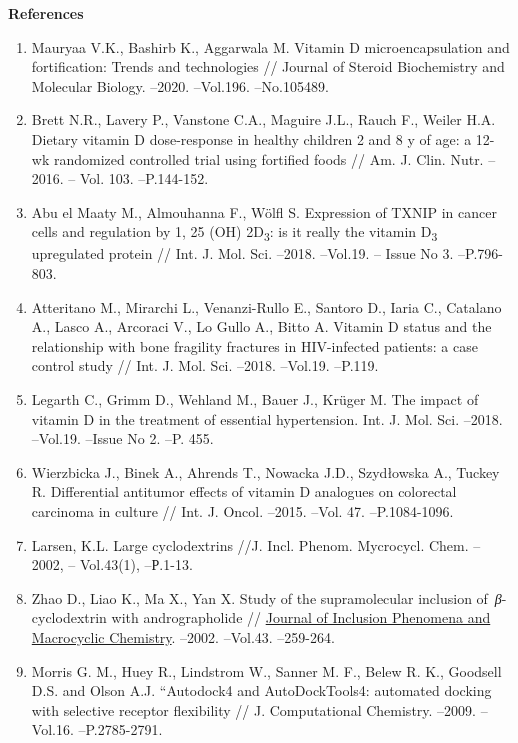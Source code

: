 {\bfseries References}


\begin{enumerate}
\item
Mauryaa V.K., Bashirb K., Aggarwala M. Vitamin D microencapsulation
and fortification: Trends and technologies // Journal of Steroid
Biochemistry and Molecular Biology. --2020. --Vol.196. --No.105489.

\item
Brett N.R., Lavery P., Vanstone C.A., Maguire J.L., Rauch F., Weiler
H.A. Dietary vitamin D dose-response in healthy children 2 and 8 y of
age: a 12-wk randomized controlled trial using fortified foods // Am. J.
Clin. Nutr. --2016. -- Vol. 103. --P.144-152.

\item
Abu el Maaty M., Almouhanna F., Wölfl S. Expression of TXNIP in
cancer cells and regulation by 1, 25 (OH) 2D\textsubscript{3}: is it
really the vitamin D\textsubscript{3} upregulated protein // Int. J.
Mol. Sci. --2018. --Vol.19. -- Issue No 3. --P.796-803.

\item
Atteritano M., Mirarchi L., Venanzi-Rullo E., Santoro D., Iaria C.,
Catalano A., Lasco A., Arcoraci V., Lo Gullo A., Bitto A. Vitamin D
status and the relationship with bone fragility fractures in
HIV-infected patients: a case control study // Int. J. Mol. Sci. --2018.
--Vol.19. --P.119.

\item
Legarth C., Grimm D., Wehland M., Bauer J., Krüger M. The impact of
vitamin D in the treatment of essential hypertension. Int. J. Mol. Sci.
--2018. --Vol.19. --Issue No 2. --P. 455.

\item
Wierzbicka J., Binek A., Ahrends T., Nowacka J.D., Szydłowska A.,
Tuckey R. Differential antitumor effects of vitamin D analogues on
colorectal carcinoma in culture // Int. J. Oncol. --2015. --Vol. 47.
--P.1084-1096.

\item
Larsen, K.L. Large cyclodextrins //J. Incl. Phenom. Mycrocycl. Chem.
--2002, -- Vol.43(1), --Р.1-13.

\item
Zhao D., Liao K., Ma X., Yan X. Study of the supramolecular inclusion
of~\emph{β}-cyclodextrin with andrographolide //
\href{https://link.springer.com/journal/10847}{Journal of Inclusion
Phenomena and Macrocyclic Chemistry}. --2002. --Vol.43. --259-264.

\item
Morris G. M., Huey R., Lindstrom W., Sanner M. F., Belew R. K.,
Goodsell D.S. and Olson A.J. ``Autodock4 and AutoDockTools4: automated
docking with selective receptor flexibility // J. Computational
Chemistry. --2009. --Vol.16. --P.2785-2791.


\end{enumerate}
